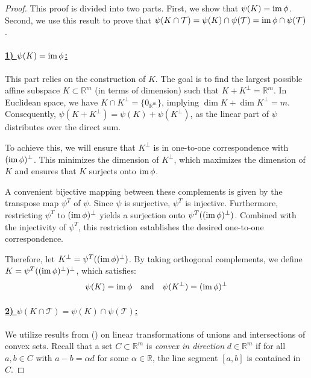 \begin{proof}
    This proof is divided into two parts. First, we show that $\psi(K) = \operatorname{im} \phi$. Second, we use this result to prove that $\psi(K \cap \mathcal{T}) = \psi(K) \cap \psi(\mathcal{T}) = \operatorname{im} \phi \cap \psi(\mathcal{T})$.

    \paragraph*{\underline{1) $\psi(K) = \operatorname{im} \phi$:}} 
    This part relies on the construction of $K$. The goal is to find the largest possible affine subspace $K \subset \mathbb{R}^m$ (in terms of dimension) such that $K + K^\perp = \mathbb{R}^m$. In Euclidean space, we have $K \cap K^\perp = \{0_{\mathbb{R}^m}\}$, implying $\dim K + \dim K^\perp = m$. Consequently,  $\psi(K + K^\perp) = \psi(K) + \psi(K^\perp)$, as the linear part of $\psi$ distributes over the direct sum.
    
    To achieve this, we will ensure that $K^\perp$ is in one-to-one correspondence with $(\operatorname{im} \phi)^\perp$. This minimizes the dimension of $K^\perp$, which maximizes the dimension of $K$ and ensures that $K$ surjects onto $\operatorname{im} \phi$.
    
    A convenient bijective mapping between these complements is given by the transpose map $\psi^T$ of $\psi$. Since $\psi$ is surjective, $\psi^T$ is injective.  Furthermore, restricting $\psi^T$ to $(\operatorname{im} \phi)^\perp$ yields a surjection onto $\psi^T((\operatorname{im} \phi)^\perp)$. Combined with the injectivity of $\psi^T$, this restriction establishes the desired one-to-one correspondence.
    
    Therefore, let $K^\perp = \psi^T((\operatorname{im} \phi)^\perp)$. By taking orthogonal complements, we define $K = \psi^T((\operatorname{im} \phi)^\perp)^\perp$, which satisfies:    
    $$\psi(K) = \operatorname{im} \phi \quad \text{and}\quad \psi(K^\perp) = (\operatorname{im}\phi)^\perp$$

    \paragraph*{\underline{2) $\psi(K \cap \mathcal{T}) = \psi(K) \cap \psi(\mathcal{T})$:}}
    We utilize results from (\cite{kushnirLinearTransformationsIntersections}) on linear transformations of unions and intersections of convex sets.  Recall that a set $C \subset \mathbb{R}^m$ is \emph{convex in direction} $d \in \mathbb{R}^m$ if for all $a, b \in C$ with $a - b = \alpha d$ for some $\alpha \in \mathbb{R}$, the line segment $[a, b]$ is contained in $C$.
    

\end{proof}
